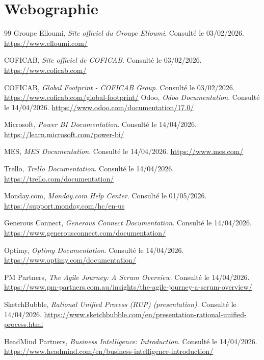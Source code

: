 \chapter*{Webographie}

\begin{thebibliography}{99}
Groupe Elloumi, \textit{Site officiel du Groupe Elloumi}. Consulté le 03/02/2026. \url{https://www.elloumi.com/}
    
COFICAB, \textit{Site officiel de COFICAB}. Consulté le 03/02/2026. \url{https://www.coficab.com/}

COFICAB, \textit{Global Footprint - COFICAB Group}. Consulté le 03/02/2026. \url{https://www.coficab.com/global-footprint/}
Odoo, \textit{Odoo Documentation}. Consulté le 14/04/2026. \url{https://www.odoo.com/documentation/17.0/}

Microsoft, \textit{Power BI Documentation}. Consulté le 14/04/2026. \url{https://learn.microsoft.com/power-bi/}

MES, \textit{MES Documentation}. Consulté le 14/04/2026. \url{https://www.mes.com/}

Trello, \textit{Trello Documentation}. Consulté le 14/04/2026. \url{https://trello.com/documentation/}

Monday.com, \textit{Monday.com Help Center}. Consulté le 01/05/2026. \url{https://support.monday.com/hc/en-us}

Generous Connect, \textit{Generous Connect Documentation}. Consulté le 14/04/2026. \url{https://www.generousconnect.com/documentation/}

Optimy, \textit{Optimy Documentation}. Consulté le 14/04/2026. \url{https://www.optimy.com/documentation/}

PM Partners, \textit{The Agile Journey: A Scrum Overview}. Consulté le 14/04/2026. \url{https://www.pm-partners.com.au/insights/the-agile-journey-a-scrum-overview/}

SketchBubble, \textit{Rational Unified Process (RUP) (presentation)}. Consulté le 14/04/2026. \url{https://www.sketchbubble.com/en/presentation-rational-unified-process.html}

HeadMind Partners, \textit{Business Intelligence: Introduction}. Consulté le 14/04/2026. \url{https://www.headmind.com/en/business-intelligence-introduction/}


\end{thebibliography}
